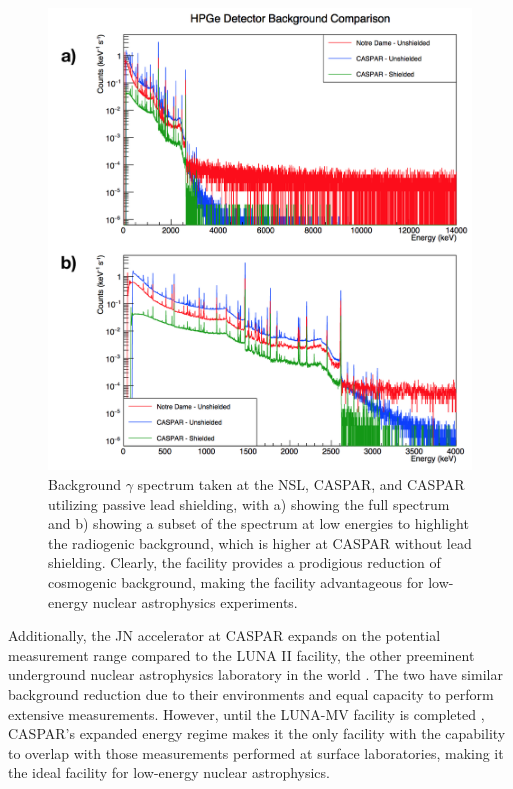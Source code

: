 \begin{figure}
\centering
\includegraphics[width=\linewidth]{figures/casparBackgrounds.png}
\caption{Background $\gamma$ spectrum taken at the NSL, CASPAR, and CASPAR utilizing passive lead shielding, with a) showing the full spectrum and b) showing a subset of the spectrum at low energies to highlight the radiogenic background, which is higher at CASPAR without lead shielding. Clearly, the facility provides a prodigious reduction of cosmogenic background, making the facility advantageous for low-energy nuclear astrophysics experiments.}
\label{fig: backgroundComparison}
\end{figure}



Additionally, the JN accelerator at CASPAR expands on the potential measurement range compared to the LUNA II facility, the other preeminent underground nuclear astrophysics laboratory in the world \cite{Formicola2003a}. The two have similar background reduction due to their environments and equal capacity to perform extensive measurements. However, until the LUNA-MV facility is completed \cite{Broggini2010, Ferraro2018}, CASPAR's expanded energy regime makes it the only facility with the capability to overlap with those measurements performed at surface laboratories, making it the ideal facility for low-energy nuclear astrophysics. 

